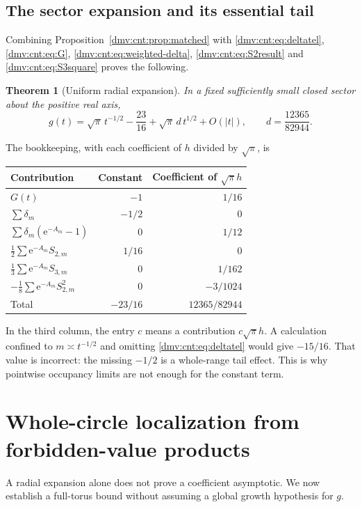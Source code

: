 \documentclass[11pt,letterpaper]{article}
\numberwithin{equation}{section}
\newtheorem{theorem}{Theorem}[section]
\theoremstyle{definition}\newtheorem{definition}[theorem]{Definition}
\theoremstyle{remark}\newtheorem{remark}[theorem]{Remark}
\newcommand{\ee}{\mathrm e}
\begin{document}
\subsection{The sector expansion and its essential tail}
Combining Proposition~\ref{dmv:cnt:prop:matched} with \eqref{dmv:cnt:eq:deltatel}, \eqref{dmv:cnt:eq:G}, \eqref{dmv:cnt:eq:weighted-delta}, \eqref{dmv:cnt:eq:S2result} and \eqref{dmv:cnt:eq:S3square} proves the following.
\begin{theorem}[Uniform radial expansion]\label{dmv:cnt:thm:radial}
In a fixed sufficiently small closed sector about the positive real axis,
\begin{equation}\label{dmv:cnt:eq:radial}
g(t)=\sqrt\pi\,t^{-1/2}-\frac{23}{16}+\sqrt\pi\,d\,t^{1/2}+O(|t|),
\qquad d=\frac{12365}{82944}.
\end{equation}
\end{theorem}
The bookkeeping, with each coefficient of $h$ divided by $\sqrt\pi$, is
\begin{center}
\renewcommand{\arraystretch}{1.2}
\begin{tabular}{@{}lrr@{}}\toprule
Contribution & Constant & Coefficient of $\sqrt\pi h$\\\midrule
$G(t)$ & $-1$ & $1/16$\\
$\sum\delta_m$ & $-1/2$ & $0$\\
$\sum\delta_m(\ee^{-A_m}-1)$ & $0$ & $1/12$\\
$\frac12\sum\ee^{-A_m}S_{2,m}$ & $1/16$ & $0$\\
$\frac13\sum\ee^{-A_m}S_{3,m}$ & $0$ & $1/162$\\
$-\frac18\sum\ee^{-A_m}S_{2,m}^2$ & $0$ & $-3/1024$\\\midrule
Total & $-23/16$ & $12365/82944$\\\bottomrule
\end{tabular}
\end{center}
In the third column, the entry $c$ means a contribution $c\sqrt\pi h$.
A calculation confined to $m\asymp t^{-1/2}$ and omitting \eqref{dmv:cnt:eq:deltatel} would give $-15/16$. That value is incorrect: the missing $-1/2$ is a whole-range tail effect. This is why pointwise occupancy limits are not enough for the constant term.

\section{Whole-circle localization from forbidden-value products}\label{dmv:cnt:sec:localization}
A radial expansion alone does not prove a coefficient asymptotic. We now establish a full-torus bound without assuming a global growth hypothesis for $g$.
\end{document}
